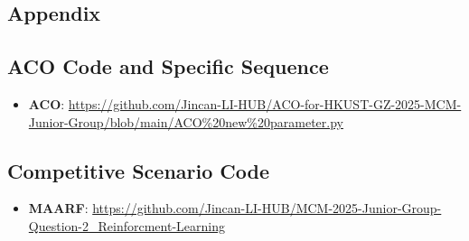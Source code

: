 \documentclass[twocolumn, a4paper]{article}
\begin{document}


\subsection{Appendix}
\small %
\appendix %
\subsection{ACO Code and Specific Sequence} 
\label{app:aco_code} 
\begin{itemize}
    \item \textbf{ACO}: \url{https://github.com/Jincan-LI-HUB/ACO-for-HKUST-GZ-2025-MCM-Junior-Group/blob/main/ACO%20new%20parameter.py}
\end{itemize}
\subsection{Competitive Scenario Code}
\label{app:competitive_code}
\begin{itemize}
    \item \textbf{MAARF}: \url{https://github.com/Jincan-LI-HUB/MCM-2025-Junior-Group-Question-2_Reinforcment-Learning}
\end{itemize}



\end{document}
